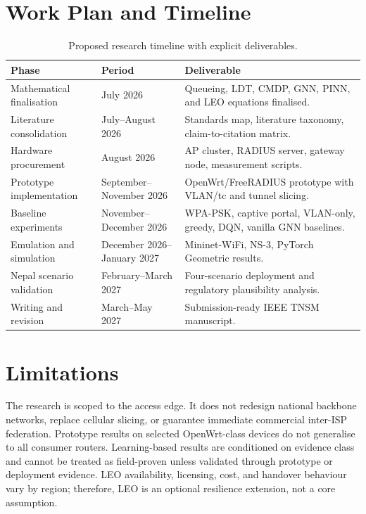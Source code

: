 \section{Work Plan and Timeline}
\label{sec:timeline}

\begin{table}[H]
\centering
\caption{Proposed research timeline with explicit deliverables.}
\label{tab:timeline}
\begin{tabularx}{\textwidth}{llX}
\toprule
\textbf{Phase} & \textbf{Period} & \textbf{Deliverable} \\
\midrule
Mathematical finalisation & July 2026 & Queueing, LDT, CMDP, GNN, PINN, and LEO equations finalised. \\
Literature consolidation & July--August 2026 & Standards map, literature taxonomy, claim-to-citation matrix. \\
Hardware procurement & August 2026 & AP cluster, RADIUS server, gateway node, measurement scripts. \\
Prototype implementation & September--November 2026 & OpenWrt/FreeRADIUS prototype with VLAN/tc and tunnel slicing. \\
Baseline experiments & November--December 2026 & WPA-PSK, captive portal, VLAN-only, greedy, DQN, vanilla GNN baselines. \\
Emulation and simulation & December 2026--January 2027 & Mininet-WiFi, NS-3, PyTorch Geometric results. \\
Nepal scenario validation & February--March 2027 & Four-scenario deployment and regulatory plausibility analysis. \\
Writing and revision & March--May 2027 & Submission-ready IEEE TNSM manuscript. \\
\bottomrule
\end{tabularx}
\end{table}

\section{Limitations}
\label{sec:limitations}

The research is scoped to the access edge. It does not redesign national backbone networks, replace cellular slicing, or guarantee immediate commercial inter-ISP federation. Prototype results on selected OpenWrt-class devices do not generalise to all consumer routers. Learning-based results are conditioned on evidence class and cannot be treated as field-proven unless validated through prototype or deployment evidence. LEO availability, licensing, cost, and handover behaviour vary by region; therefore, LEO is an optional resilience extension, not a core assumption.

